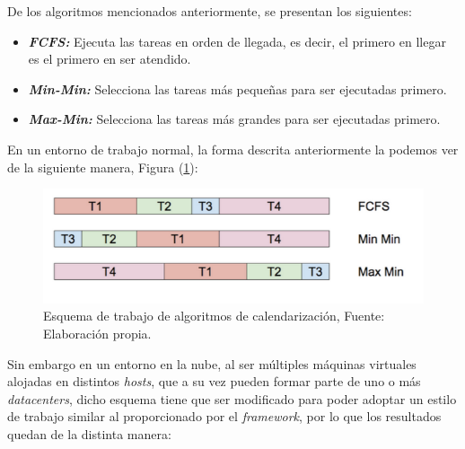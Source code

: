 De los algoritmos mencionados anteriormente, se presentan los siguientes:


\begin{itemize}
	\item \textit{\textbf{FCFS:}} Ejecuta las tareas en orden de llegada, es decir, el primero en llegar es el primero en ser atendido.
	\item \textit{\textbf{Min-Min:}} Selecciona las tareas m\'as pequeñas para ser ejecutadas primero.
	\item  \textit{\textbf{Max-Min:}} Selecciona las tareas m\'as grandes para ser ejecutadas primero.
\end{itemize}

En un entorno de trabajo normal, la forma descrita anteriormente la podemos ver de la siguiente manera, Figura (\ref{fig:cuatro}):


\setcounter{figure}{3}
\renewcommand\thefigure{\arabic{figure}}
\begin{figure}[H]
	\centering
	\includegraphics[scale=0.7]{media/imagendos}
	\caption{Esquema de trabajo de algoritmos de calendarizaci\'on, Fuente: Elaboraci\'on propia.}
	\label{fig:cuatro}
\end{figure}


Sin embargo en un entorno en la nube, al ser m\'ultiples m\'aquinas virtuales alojadas en distintos \textit{hosts}, que a su vez pueden formar parte de uno o m\'as \textit{datacenters}, dicho esquema tiene que ser modificado para poder adoptar un estilo de trabajo similar al proporcionado por el \textit{framework}, por lo que los resultados quedan de la distinta manera:

\newpage

